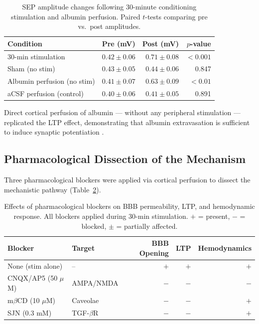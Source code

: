 \documentclass[11pt]{article}
\begin{document}
\begin{table}[H]
\centering
\caption{SEP amplitude changes following 30-minute conditioning stimulation and albumin perfusion. Paired $t$-tests comparing pre vs.\ post amplitudes.}
\label{tab:ltp}
\begin{tabular}{lrrr}
\toprule
\textbf{Condition} & \textbf{Pre (mV)} & \textbf{Post (mV)} & \textbf{$p$-value} \\
\midrule
30-min stimulation & $0.42 \pm 0.06$ & $0.71 \pm 0.08$ & $<0.001$ \\
Sham (no stim) & $0.43 \pm 0.05$ & $0.44 \pm 0.06$ & 0.847 \\
Albumin perfusion (no stim) & $0.41 \pm 0.07$ & $0.63 \pm 0.09$ & $<0.01$ \\
aCSF perfusion (control) & $0.40 \pm 0.06$ & $0.41 \pm 0.05$ & 0.891 \\
\bottomrule
\end{tabular}
\end{table}

Direct cortical perfusion of albumin --- without any peripheral stimulation --- replicated the LTP effect, demonstrating that albumin extravasation is sufficient to induce synaptic potentiation \citep{bliss1993synaptic, malenka2004ltp}.

\subsection{Pharmacological Dissection of the Mechanism}

Three pharmacological blockers were applied via cortical perfusion to dissect the mechanistic pathway (Table~\ref{tab:blockers}).

\begin{table}[H]
\centering
\caption{Effects of pharmacological blockers on BBB permeability, LTP, and hemodynamic response. All blockers applied during 30-min stimulation. $+$ = present, $-$ = blocked, $\pm$ = partially affected.}
\label{tab:blockers}
\begin{tabular}{llrrr}
\toprule
\textbf{Blocker} & \textbf{Target} & \textbf{BBB Opening} & \textbf{LTP} & \textbf{Hemodynamics} \\
\midrule
None (stim alone) & -- & $+$ & $+$ & $+$ \\
CNQX/AP5 (50 $\mu$M) & AMPA/NMDA & $-$ & $-$ & $-$ \\
m$\beta$CD (10 $\mu$M) & Caveolae & $-$ & $-$ & $+$ \\
SJN (0.3 mM) & TGF-$\beta$R & $-$ & $-$ & $+$ \\
\bottomrule
\end{tabular}
\end{table}
\end{document}
